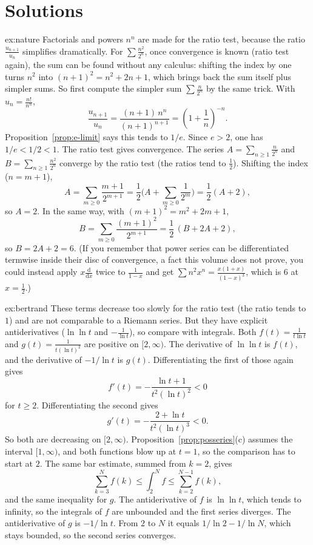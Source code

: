 \section{Solutions}
\begin{solution}{ex:nature}
\idea Factorials and powers $n^n$ are made for the ratio test, because the ratio $\frac{u_{n+1}}{u_n}$ simplifies dramatically. For $\sum\frac{n^2}{2^n}$, once convergence is known (ratio test again), the sum can be found without any calculus: shifting the index by one turns $n^2$ into $(n+1)^2=n^2+2n+1$, which brings back the sum itself plus simpler sums. So first compute the simpler sum $\sum\frac n{2^n}$ by the same trick.
\writeup With $u_n=\frac{n!}{n^n}$,
\[
\frac{u_{n+1}}{u_n}=\frac{(n+1)\,n^n}{(n+1)^{n+1}}=\left(1+\frac1n\right)^{-n}.
\]
Proposition~\ref{prop:e-limit} says this tends to $1/e$. Since $e>2$, one has $1/e<1/2<1$. The ratio test gives convergence.
The series $A=\sum_{n\ge1}\frac n{2^n}$ and $B=\sum_{n\ge1}\frac{n^2}{2^n}$ converge by the ratio test (the ratios tend to $\frac12$). Shifting the index ($n=m+1$),
\[A=\sum_{m\ge0}\frac{m+1}{2^{m+1}}=\frac12\Big(A+\sum_{m\ge0}\frac1{2^m}\Big)=\frac12(A+2),\]
so $A=2$. In the same way, with $(m+1)^2=m^2+2m+1$,
\[B=\sum_{m\ge0}\frac{(m+1)^2}{2^{m+1}}=\frac12\,(B+2A+2),\]
so $B=2A+2=6$. (If you remember that power series can be differentiated termwise inside their disc of convergence, a fact this volume does not prove, you could instead apply $x\frac{\mathrm d}{\mathrm dx}$ twice to $\frac1{1-x}$ and get $\sum n^2x^n=\frac{x(1+x)}{(1-x)^3}$, which is $6$ at $x=\frac12$.)
\end{solution}

\begin{solution}{ex:bertrand}
\idea These terms decrease too slowly for the ratio test (the ratio tends to $1$) and are not comparable to a Riemann series. But they have explicit antiderivatives ($\ln\ln t$ and $-\frac1{\ln t}$), so compare with integrals.
\writeup Both $f(t)=\frac1{t\ln t}$ and $g(t)=\frac1{t(\ln t)^2}$ are positive on $[2,\infty)$. The derivative of $\ln\ln t$ is $f(t)$, and the derivative of $-1/\ln t$ is $g(t)$. Differentiating the first of those again gives
\[
f'(t)=-\frac{\ln t+1}{t^2(\ln t)^2}<0
\]
for $t\ge 2$. Differentiating the second gives
\[
g'(t)=-\frac{2+\ln t}{t^2(\ln t)^3}<0.
\]
So both are decreasing on $[2,\infty)$. Proposition~\ref{prop:posseries}(c) assumes the interval $[1,\infty)$, and both functions blow up at $t=1$, so the comparison has to start at $2$. The same bar estimate, summed from $k=2$, gives
\[
\sum_{k=3}^{N}f(k)\le\int_2^N f\le\sum_{k=2}^{N-1}f(k),
\]
and the same inequality for $g$. The antiderivative of $f$ is $\ln\ln t$, which tends to infinity, so the integrals of $f$ are unbounded and the first series diverges. The antiderivative of $g$ is $-1/\ln t$. From $2$ to $N$ it equals $1/\ln 2-1/\ln N$, which stays bounded, so the second series converges.
\end{solution}

